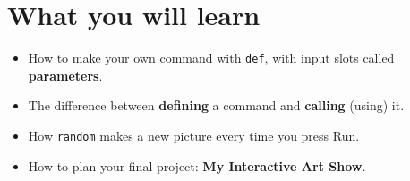 
\section{What you will learn}
\begin{itemize}[leftmargin=1.2em,itemsep=1pt]
  \item How to make your own command with \texttt{def}, with input slots called \textbf{parameters}.
  \item The difference between \textbf{defining} a command and \textbf{calling} (using) it.
  \item How \texttt{random} makes a new picture every time you press Run.
  \item How to plan your final project: \textbf{My Interactive Art Show}.
\end{itemize}

